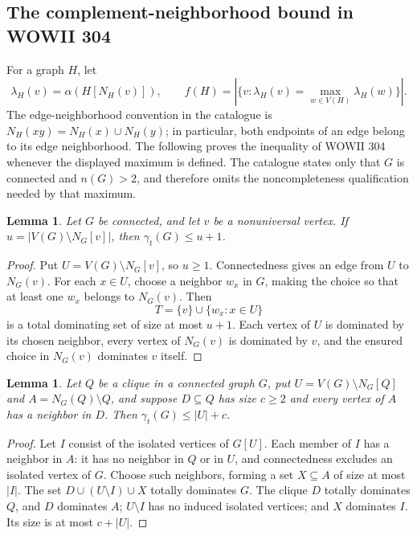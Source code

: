 \documentclass[11pt,a4paper]{article}
\newtheorem{lemma}[theorem]{Lemma}
\theoremstyle{remark}
\begin{document}
\subsection{The complement-neighborhood bound in WOWII 304}
\label{subsec:wowii304}
For a graph $H$, let
\[
 \lambda_H(v)=\alpha(H[N_H(v)]),\qquad
 f(H)=|\{v:\lambda_H(v)=\max_{w\in V(H)}\lambda_H(w)\}|.
\]
The edge-neighborhood convention in the catalogue is
$N_H(xy)=N_H(x)\cup N_H(y)$; in particular, both endpoints
of an edge belong to its edge neighborhood. The following proves the
inequality of WOWII 304 whenever the displayed maximum is defined.
The catalogue states only that $G$ is connected and $n(G)>2$, and
therefore omits the noncompleteness qualification needed by that maximum.

\begin{lemma}\label{lem:304-nonneighbors}
Let $G$ be connected, and let $v$ be a nonuniversal vertex. If
$u=|V(G)\setminus N_G[v]|$, then $\gamma_t(G)\le u+1$.
\end{lemma}
\begin{proof}
Put $U=V(G)\setminus N_G[v]$, so $u\ge1$. Connectedness gives
an edge from $U$ to $N_G(v)$. For each $x\in U$, choose a neighbor
$w_x$ in $G$, making the choice so that at least one $w_x$ belongs
to $N_G(v)$. Then
\[
 T=\{v\}\cup\{w_x:x\in U\}
\]
is a total dominating set of size at most $u+1$. Each vertex of
$U$ is dominated by its chosen neighbor, every vertex of $N_G(v)$
is dominated by $v$, and the ensured choice in $N_G(v)$ dominates
$v$ itself.
\end{proof}

\begin{lemma}\label{lem:304-clique-extension}
Let $Q$ be a clique in a connected graph $G$, put
$U=V(G)\setminus N_G[Q]$ and $A=N_G(Q)\setminus Q$, and
suppose $D\subseteq Q$ has size $c\ge2$ and every vertex of $A$
has a neighbor in $D$. Then $\gamma_t(G)\le |U|+c$.
\end{lemma}
\begin{proof}
Let $I$ consist of the isolated vertices of $G[U]$. Each member
of $I$ has a neighbor in $A$: it has no neighbor in $Q$ or in
$U$, and connectedness excludes an isolated vertex of $G$.
Choose such neighbors, forming a set $X\subseteq A$ of size at
most $|I|$. The set $D\cup(U\setminus I)\cup X$ totally
dominates $G$. The clique $D$ totally dominates $Q$, and $D$
dominates $A$; $U\setminus I$ has no induced isolated vertices;
and $X$ dominates $I$. Its size is at most $c+|U|$.
\end{proof}
\end{document}
